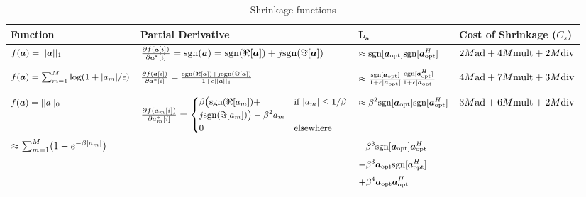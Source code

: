 \documentclass[10pt,onecolumn]{IEEEtran}
\begin{document}
\begin{table*}
\centering \vspace{-0.5em} \caption{Shrinkage functions}
\vspace{-1.25em} \footnotesize
\begin{tabular}{llll}
\hline  Function & Partial Derivative  & ${\boldsymbol
L}_{\boldsymbol a}$ & Cost of Shrinkage ($C_s$)\\
\hline
 $ {\small f({\boldsymbol a})=||{\boldsymbol a}||_{1}}$ & ${{\small \frac{\partial f({\boldsymbol a}[i])}{\partial
{\boldsymbol a}^*[i] }={\rm sgn}({\boldsymbol a})}= {\rm sgn}(\Re[
{\boldsymbol a}]) + j {\rm sgn}(\Im[{\boldsymbol a}])}$ & ${\small
\approx {\rm sgn}[ {\boldsymbol a}_{\rm opt}]{\rm sgn}[ {\boldsymbol
a}_{\rm opt}^H]} $ & ${\footnotesize 2M {\rm ad} + 4M{\rm mult} +
2M{\rm div} }$
 \\ \\
$ {\small f({\boldsymbol a})= \sum_{m=1}^M \log (1+ |a_m|/\epsilon)
}$ & ${\small \frac{\partial f({\boldsymbol a}[i])}{\partial
{\boldsymbol a}^*[i] }=\frac{{\rm sgn}(\Re[{\boldsymbol a}]) + j
{\rm sgn}(\Im [ {\boldsymbol a}])}{1+ \epsilon ||{\boldsymbol
a}||_{1}}}$ & ${\small \approx \frac{{\rm sgn}[ {\boldsymbol a}_{\rm
opt}]}{1+\epsilon|{\boldsymbol a}_{\rm opt} |}\frac{{\rm
sgn}[ {\boldsymbol a}_{\rm opt}^H]}{1+\epsilon|{\boldsymbol a}_{\rm opt} |}}$  & ${\small 4M {\rm ad} + 7M{\rm mult} + 3M{\rm div}}$\\ \\
${\small f({\boldsymbol a}) = ||a||_0 }$ & ${\small \frac{\partial
f({ a}_m[i])}{\partial { a}^*_m[i] }=   \begin{cases}
    \beta \big( {\rm sgn}(\Re[a_m]) +   & \text{if } |a_m| \leq 1/\beta \\
     j{\rm sgn}(\Im[a_m]) \big)- \beta^2 a_m & \\
    0       & {\rm elsewhere}
   \end{cases}}$ & ${\small \approx \beta^2 {\rm sgn}[ {\boldsymbol a}_{\rm opt}]{\rm sgn}[ {\boldsymbol a}_{\rm opt}^H]
    }$ & ${\small 3M {\rm ad} + 6M{\rm mult} + 2M{\rm div}}$ \\
   ${\small \approx \sum_{m=1}^{M} (1 - e^{-\beta |a_m|})}$ & & ${\small - \beta^3 {\rm sgn}[{\boldsymbol a}_{\rm opt}]{\boldsymbol a}_{\rm opt}^H }$   &
\\
    & & ${\small - \beta^3 {\boldsymbol a}_{\rm opt}{\rm sgn}[{\boldsymbol a}_{\rm opt}^H] }$   &
\\
    & & ${\small + \beta^4 {\boldsymbol a}_{\rm opt}{\boldsymbol a}_{\rm opt}^H }$   &

\\
\hline
\end{tabular}
\label{table1}
\end{table*}
\end{document}
